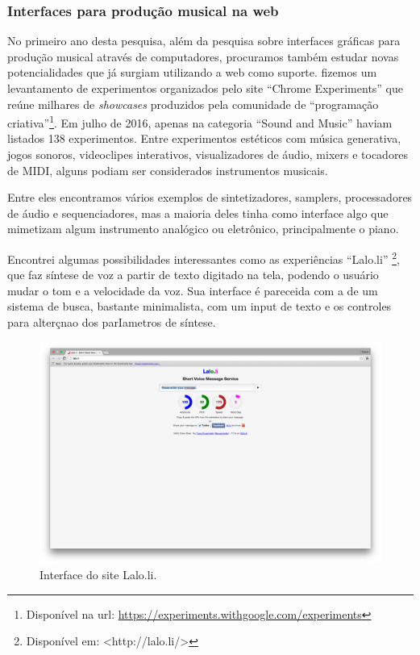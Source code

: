 \subsubsection{Interfaces para produção musical na web}
No primeiro ano desta pesquisa, além da pesquisa sobre interfaces gráficas para produção musical através de computadores, procuramos também estudar novas potencialidades que já surgiam utilizando a web como suporte.  fizemos um levantamento de experimentos organizados pelo site ``Chrome Experiments'' que reúne milhares de \emph{showcases} produzidos pela comunidade de ``programação criativa''\footnote{Disponível na url: \url{https://experiments.withgoogle.com/experiments}}. Em julho de 2016, apenas na categoria ``Sound and Music''  haviam listados 138 experimentos. Entre experimentos estéticos com música generativa, jogos sonoros, videoclipes interativos, visualizadores de áudio, mixers e tocadores de MIDI, alguns podiam ser considerados instrumentos musicais. 

Entre eles encontramos vários exemplos de sintetizadores, samplers, processadores de áudio e sequenciadores, mas a maioria deles tinha como interface algo que mimetizam algum instrumento analógico ou eletrônico, principalmente o piano.

Encontrei algumas possibilidades interessantes como as experiências ``Lalo.li'' \footnote{Disponível em: <http://lalo.li/> }, que faz síntese de voz a partir de texto digitado na tela, podendo o usuário mudar o tom e a velocidade da voz. Sua interface é pareceida com a de um sistema de busca, bastante minimalista, com um input de texto e os controles para alterçnao dos parIametros de síntese.

\begin{figure}
    \caption{\label{laloli}Interface do site Lalo.li.}
    
        \includegraphics[width=1\linewidth]{pictures/cap2/laloli}
    
\end{figure}

